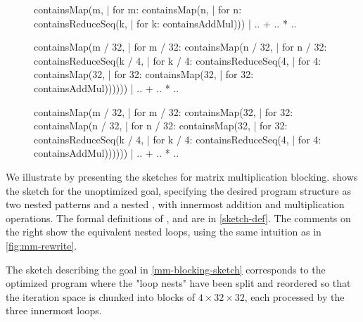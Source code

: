 \begin{figure}
\begin{minipage}{0.75\linewidth}
\begin{center}
\begin{rise-sketch}[caption={Sketch for the \goalStyle{baseline} matrix multiplication goal}, label={mm-baseline-sketch}]
containsMap(m,                | for m:
 containsMap(n,               |  for n:
  containsReduceSeq(k,        |   for k:
   containsAddMul)))          |     .. + .. * ..
\end{rise-sketch}
\begin{rise-sketch}[caption={Sketch for the \goalStyle{blocking} matrix multiplication goal}, label={mm-blocking-sketch}]
containsMap(m / 32,           | for m / 32:
 containsMap(n / 32,          |  for n / 32:
  containsReduceSeq(k / 4,    |   for k / 4:
   containsReduceSeq(4,       |    for 4:
    containsMap(32,           |     for 32:
     containsMap(32,          |      for 32:
      containsAddMul))))))    |        .. + .. * ..
\end{rise-sketch}
\begin{rise-sketch}[caption={Sketch guide specifying how to split loops for \goalStyle{blocking}}, label={mm-blocking-split-sketch}]
containsMap(m / 32,           | for m / 32:
 containsMap(32,              |  for 32:
  containsMap(n / 32,         |   for n / 32:
   containsMap(32,            |    for 32:
    containsReduceSeq(k / 4,  |     for k / 4:
     containsReduceSeq(4,     |      for 4:
      containsAddMul))))))    |        .. + .. * ..
\end{rise-sketch}
\end{center}
\end{minipage}
\end{figure}

We illustrate by presenting the sketches for matrix multiplication blocking.
 shows the sketch for the unoptimized  goal, specifying the desired program structure as two nested  patterns and a nested , with innermost addition and multiplication operations. The formal definitions of ,  and  are in \cref{sketch-def}.
The comments on the right show the equivalent nested  loops, using the same intuition as in \cref{fig:mm-rewrite}.

The sketch describing the  goal in \cref{mm-blocking-sketch} corresponds to the optimized program where the "loop nests" have been split and reordered so that the iteration space is chunked into blocks of $4 \times 32 \times 32$, each processed by the three innermost  loops.

